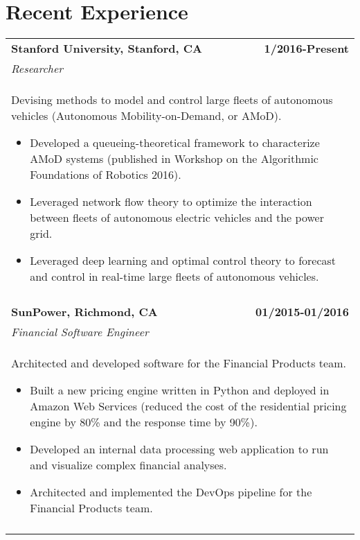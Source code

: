 \documentclass[a4paper,10pt]{article}
\begin{document}
\section{Recent Experience}
\begin{tabularx}{\textwidth}{Xr}

 \bf{Stanford University}, Stanford, CA & \bf{1/2016-Present}\\
 \emph{Researcher} &\\
 \multicolumn{2}{p{0.98\textwidth}}{
 Devising methods to model and control large fleets of autonomous vehicles (Autonomous Mobility-on-Demand, or AMoD). 
 \begin{itemize}
 	\item Developed a queueing-theoretical framework to characterize AMoD systems (published in Workshop on the Algorithmic Foundations of Robotics 2016).
 	\item Leveraged network flow theory to optimize the interaction between fleets of autonomous electric vehicles and the power grid.
 	\item Leveraged deep learning and optimal control theory to forecast and control in real-time large fleets of autonomous vehicles.
 \end{itemize}
 }\\
 \multicolumn{2}{c}{} \\

\bf{SunPower}, Richmond, CA & \bf{01/2015-01/2016}\\
\emph{Financial Software Engineer} &\\
\multicolumn{2}{p{0.98\textwidth}}{
Architected and developed software for the Financial Products team. 
\begin{itemize}
	\item Built a new pricing engine written in Python and deployed in Amazon Web Services (reduced the cost of the residential pricing engine by 80\% and the response time by 90\%).
	\item Developed an internal data processing web application to run and visualize complex financial analyses.
	\item Architected and implemented the DevOps pipeline for the Financial Products team.
\end{itemize}
}\\
\multicolumn{2}{X}{} \\


\end{tabularx}
\end{document}

